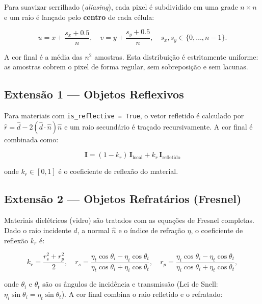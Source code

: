 \documentclass[12pt,a4paper]{article}
\begin{document}
Para suavizar serrilhado (\textit{aliasing}), cada pixel é subdividido
em uma grade $n \times n$ e um raio é lançado pelo \textbf{centro} de
cada célula:

\[
  u = x + \frac{s_x + 0.5}{n}, \quad v = y + \frac{s_y + 0.5}{n},
  \quad s_x, s_y \in \{0,\ldots,n-1\}.
\]

A cor final é a média das $n^2$ amostras. Esta distribuição é
estritamente uniforme: as amostras cobrem o pixel de forma regular, sem
sobreposição e sem lacunas.

\subsection{Extensão 1 — Objetos Reflexivos}

Para materiais com \texttt{is\_reflective = True}, o vetor refletido é
calculado por $\hat{r} = \hat{d} - 2(\hat{d}\cdot\hat{n})\hat{n}$ e um
raio secundário é traçado recursivamente. A cor final é combinada como:

\[
  \mathbf{I} = (1 - k_r)\,\mathbf{I}_{\text{local}} + k_r\,\mathbf{I}_{\text{refletido}}
\]

onde $k_r \in [0,1]$ é o coeficiente de reflexão do material.

\subsection{Extensão 2 — Objetos Refratários (Fresnel)}

Materiais dielétricos (vidro) são tratados com as equações de Fresnel
completas. Dado o raio incidente $\hat{d}$, a normal $\hat{n}$ e o
índice de refração $\eta$, o coeficiente de reflexão $k_r$ é:

\[
  k_r = \frac{r_s^2 + r_p^2}{2},
  \quad
  r_s = \frac{\eta_t \cos\theta_i - \eta_i \cos\theta_t}
             {\eta_t \cos\theta_i + \eta_i \cos\theta_t},
  \quad
  r_p = \frac{\eta_i \cos\theta_i - \eta_t \cos\theta_t}
             {\eta_i \cos\theta_i + \eta_t \cos\theta_t},
\]

onde $\theta_i$ e $\theta_t$ são os ângulos de incidência e transmissão
(Lei de Snell: $\eta_i\sin\theta_i = \eta_t\sin\theta_t$). A cor final
combina o raio refletido e o refratado:
\end{document}
